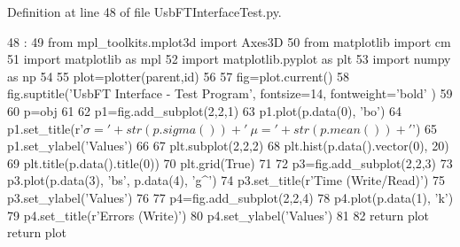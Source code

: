 Definition at line 48 of file UsbFTInterfaceTest.py.


\begin{DoxyCode}
48                               :
49     from mpl_toolkits.mplot3d import Axes3D
50     from matplotlib import cm
51     import matplotlib as mpl
52     import matplotlib.pyplot as plt
53     import numpy as np
54 
55     plot=plotter(parent,id)
56 
57     fig=plot.current()    
58     fig.suptitle('UsbFT Interface - Test Program', fontsize=14, fontweight='bold'
      )
59     
60     p=obj
61     
62     p1=fig.add_subplot(2,2,1)
63     p1.plot(p.data(0), 'bo')
64     p1.set_title(r'$\sigma='+str(p.sigma())+'\ \mu='+str(p.mean())+'$')
65     p1.set_ylabel('Values')
66     
67     plt.subplot(2,2,2)
68     plt.hist(p.data().vector(0), 20)
69     plt.title(p.data().title(0))
70     plt.grid(True)
71     
72     p3=fig.add_subplot(2,2,3)
73     p3.plot(p.data(3), 'bs', p.data(4), 'g^')
74     p3.set_title(r'Time (Write/Read)')
75     p3.set_ylabel('Values')
76     
77     p4=fig.add_subplot(2,2,4)
78     p4.plot(p.data(1), 'k')
79     p4.set_title(r'Errors (Write)')
80     p4.set_ylabel('Values')
81     
82     return plot
    return plot
\end{DoxyCode}
